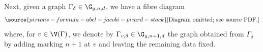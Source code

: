Next, given a graph $\Gamma_\delta \in \G_{g,n,d}$, we have a fibre diagram
\begin{equation} \label{eqn:forgetgluefibre}
\source{pixtons-formula-abel-jacobi-picard-stack}
\text{[Diagram omitted; see source PDF.]}
\end{equation}
where, for $v \in \V(\Gamma)$, we denote by $\Gamma_{v,\delta} \in \G_{g,n+1,d}$ the graph obtained from $\Gamma_\delta$ by adding marking $n+1$ at $v$ and leaving the remaining data fixed.

